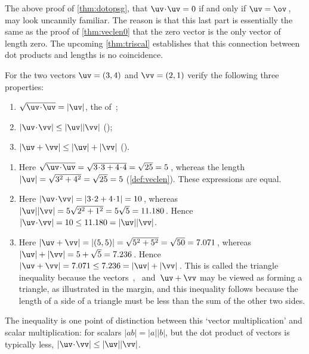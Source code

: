 The above proof of \autoref{thm:dotopsg}, that \(\uv\cdot\uv=0\) if and only if \(\uv=\ov\)\,, may look uncannily familiar.
The reason is that this last part is essentially the same as the proof of \autoref{thm:veclen0} that the zero vector is the only vector of length zero.
The upcoming \autoref{thm:triscal} establishes that this connection between dot products and lengths is no coincidence.




\begin{example} \label{eg:triscal}
For the two vectors \(\uv=(3,4)\) and \(\vv=(2,1)\) verify the following three properties: 
\begin{enumerate}
\item \(\sqrt{\uv\cdot\uv}=|\uv|\), the  of~\uv;
\item \(|\uv\cdot\vv|\leq|\uv||\vv|\) ();
\item \(|\uv+\vv|\leq|\uv|+|\vv|\) ().
\end{enumerate}

\begin{solution} 
\begin{enumerate}
\item Here \(\sqrt{\uv\cdot\uv}=\sqrt{3\cdot3+4\cdot4}=\sqrt{25}=5\)\,, whereas the length \(|\uv|=\sqrt{3^2+4^2}=\sqrt{25}=5\) (\autoref{def:veclen}). These expressions are equal.

\item Here \(|\uv\cdot\vv|=|3\cdot2+4\cdot1|=10\)\,, whereas  \(|\uv||\vv|=5\sqrt{2^2+1^2}=5\sqrt5=11.180\)\,.  
Hence \(|\uv\cdot\vv|=10\leq11.180=|\uv||\vv|\).

\item Here \(|\uv+\vv|=|(5,5)|=\sqrt{5^2+5^2}=\sqrt{50}=7.071\)\,, whereas \(|\uv|+|\vv|=5+\sqrt5=7.236\)\,.
Hence \(|\uv+\vv|=7.071\leq7.236=|\uv|+|\vv|\)\,.
%
This is called the triangle inequality because the vectors~\uv, \vv\ and~\(\uv+\vv\) may be viewed as forming a triangle, as illustrated in the margin, and this inequality follows because the length of a side  of a triangle must be less than the sum of the other two sides.
\end{enumerate}
\end{solution}
\end{example}


The  inequality is one point of distinction between this `vector multiplication' and scalar multiplication: for scalars \(|ab|=|a||b|\), but the dot product of vectors is typically less, \(|\uv\cdot\vv|\leq|\uv||\vv|\).


